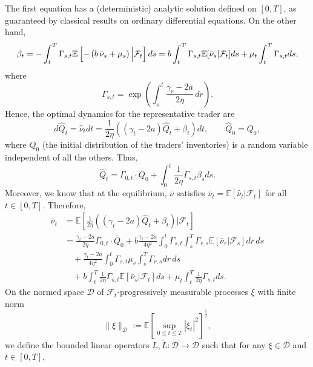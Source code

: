 \documentclass[10pt]{article}
\begin{document}
The first equation has a (deterministic) analytic solution defined on \( [0,T] \), as guaranteed by classical results on ordinary differential equations. On the other hand, 
\begin{align}\label{defbeta}
\beta_t = -\int_t^T \Gamma_{s,t} \mathbb{E} \left[ - \left(b\,\bar \nu_s + \mu_s \right) \Big| \mathcal{F}_t \right] ds \notag
= b \int_t^T \Gamma_{s,t} \mathbb{E}[\bar \nu_s |\mathcal{F}_t] ds + \mu_t \int_t^T \Gamma_{s,t} ds,
\end{align}
where
$$
    \Gamma_{s,t} = \exp \left( \int_s^t \frac{\gamma_r - 2a}{2\eta} \, dr \right).
$$
Hence, the optimal dynamics for the representative trader are 
\begin{equation}\label{defhatnu}
d\hat{Q}_t = \hat{\nu}_t dt = \frac{1}{2\eta} \left( (\gamma_t - 2a)\hat{Q}_t + \beta_t \right) dt, \qquad \hat{Q}_0 = Q_0,
\end{equation}
where $Q_0$ (the initial distribution of the traders' inventories) is a random variable independent of all the others. Thus, 
\begin{equation}\label{defhatQ}
\hat{Q}_t = \Gamma_{0,t} \cdot Q_0 + \int_0^t \frac{1}{2\eta} \Gamma_{s,t} \beta_s ds.
\end{equation}
Moreover, we know that at the equilibrium, $\bar{\nu}$ satisfies $\bar{\nu}_t = \mathbb{E}[\hat{\nu}_t | \mathcal{F}_t]$ for all $t \in [0,T]$. Therefore,
\begin{align*}
    \bar{\nu}_t &= \mathbb{E} \left[ \frac{1}{2\eta} \left( (\gamma_t - 2a) \hat{Q}_t + \beta_t \right) \Big| \mathcal{F}_t \right] \\
    &= \frac{\gamma_t - 2a}{2\eta} \Gamma_{0,t} \cdot \bar{Q}_0 
     + b \frac{\gamma_t - 2a}{4\eta^2} \int_0^t \Gamma_{s,t} \int_s^T \Gamma_{r,s} \mathbb{E}[\bar{\nu}_r |\mathcal{F}_s] dr \, ds \\
     & \quad + \frac{\gamma_t - 2a}{4\eta^2} \int_0^t \Gamma_{s,t} \mu_s \int_s^T \Gamma_{r,s} dr \, ds \\
    & \quad + b \int_t^T \frac{1}{2\eta} \Gamma_{s,t} \mathbb{E}[\bar{\nu}_s |\mathcal{F}_t] ds + \mu_t \int_t^T \frac{1}{2\eta} \Gamma_{s,t} ds.
\end{align*}
On the normed space $\mathcal{D}$ of $\mathcal{F}_t$-progressively measurable processes $\xi$ with finite norm 
$$
\|\xi\|_{\mathcal{D}} := \mathbb{E} \left[ \sup_{0 \leq t \leq T} |\xi_t|^2 \right]^{\frac 12},
$$ 
we define the bounded linear operators $L, \tilde{L}: \mathcal{D} \to \mathcal{D}$ such that for any $\xi \in \mathcal{D}$ and $t \in [0,T]$,
\end{document}
